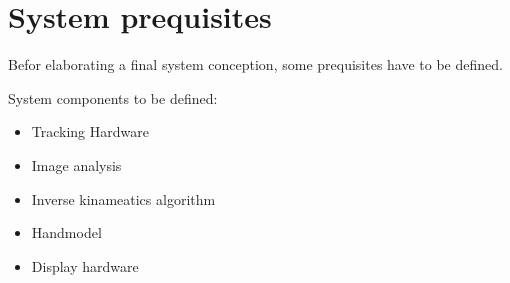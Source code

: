 \chapter{System prequisites}

Befor elaborating a final system conception, some prequisites have to be defined.

System components to be defined:
\begin{itemize}
 \item Tracking Hardware
 \item Image analysis
 \item Inverse kinameatics algorithm
 \item Handmodel
 \item Display hardware 
 \end{itemize} 

